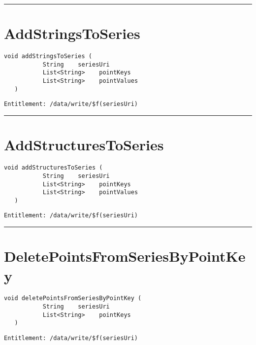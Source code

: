 \rule{12cm}{2pt}
\section{AddStringsToSeries}
\label{Api:AddStringsToSeries}
\begin{lstlisting}[style=nonumbers]
   void addStringsToSeries (
           String    seriesUri
           List<String>    pointKeys
           List<String>    pointValues
   )
\end{lstlisting}
\begin{Verbatim}[formatcom=\color{Maroon}]
  Entitlement: /data/write/$f(seriesUri)
\end{Verbatim}



\rule{12cm}{2pt}
\section{AddStructuresToSeries}
\label{Api:AddStructuresToSeries}
\begin{lstlisting}[style=nonumbers]
   void addStructuresToSeries (
           String    seriesUri
           List<String>    pointKeys
           List<String>    pointValues
   )
\end{lstlisting}
\begin{Verbatim}[formatcom=\color{Maroon}]
  Entitlement: /data/write/$f(seriesUri)
\end{Verbatim}



\rule{12cm}{2pt}
\section{DeletePointsFromSeriesByPointKey}
\label{Api:DeletePointsFromSeriesByPointKey}
\begin{lstlisting}[style=nonumbers]
   void deletePointsFromSeriesByPointKey (
           String    seriesUri
           List<String>    pointKeys
   )
\end{lstlisting}
\begin{Verbatim}[formatcom=\color{Maroon}]
  Entitlement: /data/write/$f(seriesUri)
\end{Verbatim}



